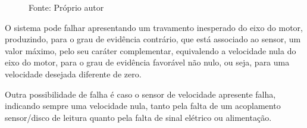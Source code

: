 \begin{figure}[!htb]
{}

\label{fig:regiaoMaxInconsistencia}

{\small Fonte: Próprio autor}
\end{figure}










O sistema pode falhar apresentando um travamento inesperado do eixo do motor,
produzindo, para o grau de evidência contrário,
que está associado ao sensor, um valor máximo,
pelo seu caráter complementar, equivalendo a velocidade nula do eixo do motor,
para o grau de evidência favorável não nulo, ou seja,
para uma velocidade desejada diferente de zero.

Outra possibilidade de falha é caso o sensor de velocidade apresente falha,
indicando sempre uma velocidade nula,
tanto pela falta de um acoplamento sensor/disco de leitura quanto pela
falta de sinal elétrico ou alimentação.

